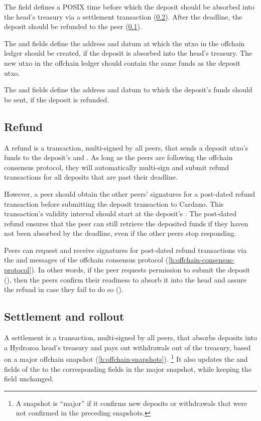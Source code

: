 \documentclass[../hydrozoa.tex]{subfiles}
\begin{document}
The  field defines a POSIX time before which the deposit should be absorbed into the head's treasury via a settlement transaction (\cref{h:multisig-settle}).
After the deadline, the deposit should be refunded to the peer (\cref{h:multisig-refund}).

The  and  fields define the address and datum at which the utxo in the offchain ledger should be created, if the deposit is absorbed into the head's treasury.
The new utxo in the offchain ledger should contain the same funds as the deposit utxo.

The  and  fields define the address and datum to which the deposit's funds should be sent, if the deposit is refunded.

\subsection{Refund}%
\label{h:multisig-refund}
A refund is a transaction, multi-signed by all peers, that sends a deposit utxo's funds to the deposit's  and .
As long as the peers are following the offchain consensus protocol, they will automatically multi-sign and submit refund transactions for all deposits that are past their deadline.

However, a peer should obtain the other peers' signatures for a post-dated refund transaction before submitting the deposit transaction to Cardano.
This transaction's validity interval should start at the deposit's .
The post-dated refund ensures that the peer can still retrieve the deposited funds if they haven not been absorbed by the deadline, even if the other peers stop responding.

Peers can request and receive signatures for post-dated refund transactions via the  and  messages of the offchain consensus protocol (\cref{h:offchain-consensus-protocol}).
In other words, if the peer requests permission to submit the deposit (), then the peers confirm their readiness to absorb it into the head and assure the refund in case they fail to do so ().

\subsection{Settlement and rollout}%
\label{h:multisig-settle}
A settlement is a transaction, multi-signed by all peers, that absorbs deposits into a Hydrozoa head's treasury and pays out withdrawals out of the treasury, based on a major offchain snapshot (\cref{h:offchain-snapshots}).%
\footnote{A snapshot is ``major'' if it confirms new deposits or withdrawals that were not confirmed in the preceding snapshots.}
It also updates the  and  fields of the  to the corresponding fields in the major snapshot, while keeping the  field unchanged.
\end{document}

